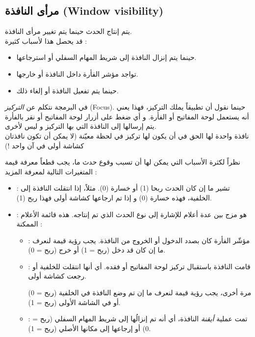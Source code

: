 \subsection{مرأى النافذة (\textenglish{Window visibility})}

يتم إنتاج الحدث
حينما يتم تغيير مرأى النافذة.\\
قد يحصل هذا لأسباب كثيرة :

\begin{itemize}
	\item حينما يتم إنزال النافذة إلى شريط المهام السفلي أو استرجاعها.
	\item تواجد مؤشر الفأرة داخل النافذة أو خارجها.
	\item حينما يتم تفعيل النافذة أو إلغاء ذلك.
\end{itemize}

\begin{information}
في البرمجة نتكلم عن
\textit{التركيز}
(\textenglish{Focus}).
حينما نقول أن تطبيقاً يملك التركيز، فهذا يعني أنه يستعمل لوحة المفاتيح أو الفأرة. و أي ضغط على أزرار لوحة المفاتيح أو نقر بالفأرة يتم إرسالها إلى النافذة التي بها التركيز و ليس لأخرى.\\
نافذة واحدة لها الحق في أن يكون لها تركيز في لحظة معيّنة (لا يمكن أن تكون نافذتان كشاشة أولى في آن واحد !)
\end{information}

نظراً لكثرة الأسباب التي يمكن لها أن تسبب وقوع حدث ما، يجب قطعاً معرفة قيمة المتغيرات التالية لمعرفة المزيد :

\begin{itemize}
	\item {} :
تشير ما إن كان الحدث ربحا (1) أو خسارة (0). مثلاً، إذا انتقلت النافذة إلى الخلفية، فهذه خسارة (0) و إذا تم ارجاعها كشاشة أولى فهذا ربح (1).
	\item {} :
	هو مزج بين عدة أعلام للإشارة إلى نوع الحدث الذي تم إنتاجه. هذه قائمة الأعلام الممكنة :
	\begin{itemize}
		\item {} :
		مؤشّر الفأرة كان بصدد الدخول أو الخروج من النافذة. 
		يجب رؤية قيمة
		لنعرف ما إن كان قد دخل (ربح = 1) أو خرج (ربح = 0).
		\item {} :
		قامت النافذة باستقبال تركيز لوحة المفاتيح أو فقده. أي أنها انتقلت للخلفية أو رجعت كشاشة أولى.
		
		مرة أخرى، يجب رؤية قيمة 
		لنعرف ما إن تم وضع النافذة في الخلفية (ربح = 0) أو في الشاشة الأولى (ربح = 1).
		\item {} :
		تمت عملية
		\textit{أيقنة}
		النافذة، أي أنه تم إنزالُها إلى شريط المهام السفلي (ربح = 0) أو إرجاعها إلى مكانها الأصلي (ربح = 1).
	\end{itemize}
\end{itemize}

